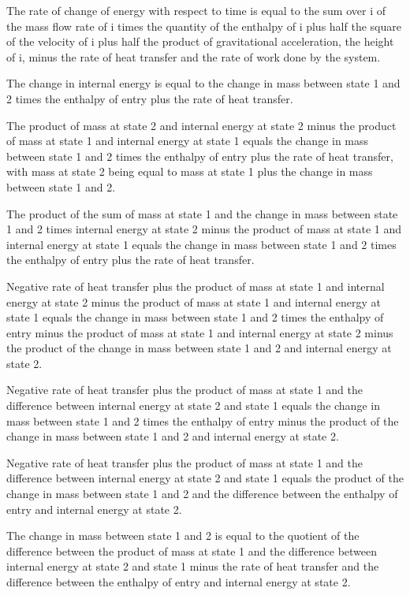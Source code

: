 The rate of change of energy with respect to time is equal to the sum over i of the mass flow rate of i times the quantity of the enthalpy of i plus half the square of the velocity of i plus half the product of gravitational acceleration, the height of i, minus the rate of heat transfer and the rate of work done by the system.

The change in internal energy is equal to the change in mass between state 1 and 2 times the enthalpy of entry plus the rate of heat transfer.

The product of mass at state 2 and internal energy at state 2 minus the product of mass at state 1 and internal energy at state 1 equals the change in mass between state 1 and 2 times the enthalpy of entry plus the rate of heat transfer, with mass at state 2 being equal to mass at state 1 plus the change in mass between state 1 and 2.

The product of the sum of mass at state 1 and the change in mass between state 1 and 2 times internal energy at state 2 minus the product of mass at state 1 and internal energy at state 1 equals the change in mass between state 1 and 2 times the enthalpy of entry plus the rate of heat transfer.

Negative rate of heat transfer plus the product of mass at state 1 and internal energy at state 2 minus the product of mass at state 1 and internal energy at state 1 equals the change in mass between state 1 and 2 times the enthalpy of entry minus the product of mass at state 1 and internal energy at state 2 minus the product of the change in mass between state 1 and 2 and internal energy at state 2.

Negative rate of heat transfer plus the product of mass at state 1 and the difference between internal energy at state 2 and state 1 equals the change in mass between state 1 and 2 times the enthalpy of entry minus the product of the change in mass between state 1 and 2 and internal energy at state 2.

Negative rate of heat transfer plus the product of mass at state 1 and the difference between internal energy at state 2 and state 1 equals the product of the change in mass between state 1 and 2 and the difference between the enthalpy of entry and internal energy at state 2.

The change in mass between state 1 and 2 is equal to the quotient of the difference between the product of mass at state 1 and the difference between internal energy at state 2 and state 1 minus the rate of heat transfer and the difference between the enthalpy of entry and internal energy at state 2.

